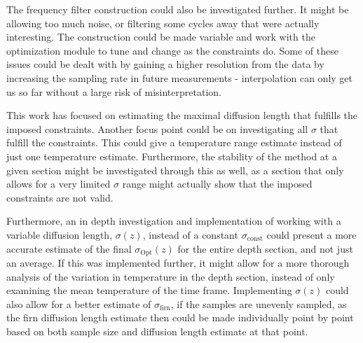 \documentclass[../../CompleteThesis2/Complete_2ndDraft]{subfiles}
\begin{document}
The frequency filter construction could also be investigated further. It might be allowing too much noise, or filtering some cycles away that were actually interesting. The construction could be made variable and work with the optimization module to tune and change as the constraints do. Some of these issues could be dealt with by gaining a higher resolution from the data by increasing the sampling rate in future measurements - interpolation can only get us so far without a large risk of misinterpretation. 

This work has focused on estimating the maximal diffusion length that fulfills the imposed constraints. Another focus point could be on investigating all $\sigma$ that fulfill the constraints. This could give a temperature range estimate instead of just one temperature estimate. Furthermore, the stability of the method at a given section might be investigated through this as well, as a section that only allows for a very limited $\sigma$ range might actually show that the imposed constraints are not valid.


Furthermore, an in depth investigation and implementation of working with a variable diffusion length, $\sigma(z)$, instead of a constant $\sigma_{\text{const}}$ could present a more accurate estimate of the final $\sigma_{\text{Opt}}(z)$ for the entire depth section, and not just an average. If this was implemented further, it might allow for a more thorough analysis of the variation in temperature in the depth section, instead of only examining the mean temperature of the time frame. Implementing $\sigma(z)$ could also allow for a better estimate of $\sigma_{\text{firn}}$, if the samples are unevenly sampled, as the firn diffusion length estimate then could be made individually point by point based on both sample size and diffusion length estimate at that point.

%
\end{document}
